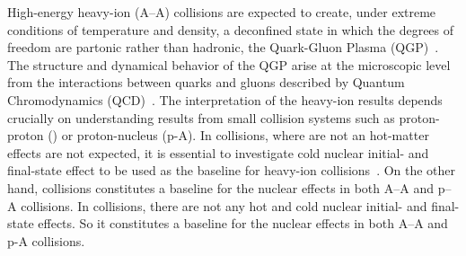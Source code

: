 \documentclass[ALICE,manyauthors]{cernphprep}
\begin{document}
High-energy heavy-ion (A--A) collisions are expected to create, under extreme conditions of temperature and density, a deconfined state in which the degrees of freedom are partonic rather than hadronic, the Quark-Gluon Plasma (QGP)~\cite{Rafelski:126179, Satz:2000bn, Shuryak:1983ni, Jacak:2012dx, Cleymans:1985wb, Bass:1998vz, BraunMunzinger:2007zz}.
The structure and dynamical behavior of the QGP arise at the microscopic level from the interactions between quarks and gluons described by Quantum Chromodynamics (QCD)~\cite{Laermann:2003cv, Gupta:2011wh, Bhattacharya:2014ara}.
The interpretation of the heavy-ion results depends crucially on understanding results from small collision systems such as proton-proton (\pp) or proton-nucleus (p-A).
In \pPb collisions, where are not an hot-matter effects are not expected, it is essential to investigate cold nuclear initial- and final-state effect to be used as the baseline for heavy-ion collisions~\cite{Salgado:2011wc, Eskola:2016oht}.
On the other hand, \pp collisions constitutes a baseline for the nuclear effects in both A--A and p--A collisions.
In \pp collisions, there are not any hot and cold nuclear initial- and final-state effects.
So it constitutes a baseline for the nuclear effects in both A--A and p-A collisions.
\end{document}
